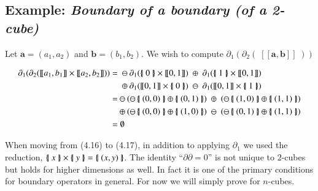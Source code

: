 
\subsection{Example: \emph{Boundary of a boundary (of a 2-cube)}}
Let $\boldsymbol{a} =(a_1,a_2)$ and $\boldsymbol{b}= (b_1,b_2)$.
We wish to compute $\partial_1 ( \partial_2 ( \; [\![\boldsymbol{a}, \boldsymbol{b} ]\!] \; ) )$

\begin{align}
	\partial_1 ( \partial_2 ( [\![ a_1 , b_1 ]\!] \times [\![a_2, b_2 ]\!] ) )
	=	& \; \ominus \partial_1( \hset{0} \times [\![0,1]\!]) \; \oplus 	\; \partial_1(\hset{1} \times [\![0,1]\!]) \notag \\
		& \; \oplus 	\partial_1( [\![0,1]\!] \times \hset{0}) \; \ominus \; \partial_1([\![0,1]\!] \times \hset{1}) \\
	=	& \ominus	( \ominus \hset{(0,0)} \oplus \hset{(0,1)} ) \; \oplus \; 	(\ominus \hset{(1,0)} \oplus \hset{(1,1)}) \notag \\
		& \oplus 	( \ominus \hset{(0,0)} \oplus \hset{(1,0)} ) \; \ominus \;	(\ominus \hset{(0,1)} \oplus \hset{(1,1)}) \\
	=	& \;\emptyset	
\end{align}

When moving from (4.16) to (4.17), in addition to applying $\partial_1$ we used the reduction, $\left\{ \! \left| \; x \; \right| \! \right\} \times \left\{ \! \left| \; y \; \right| \! \right\} = \left\{ \! \left| \;  (x,y)  \; \right| \! \right\}$.
The identity ``$\partial \partial = 0$'' is not unique to $2$-cubes but holds for higher dimensions as well.
In fact it is one of the primary conditions for boundary operators in general.
For now we will simply prove for $n$-cubes.


